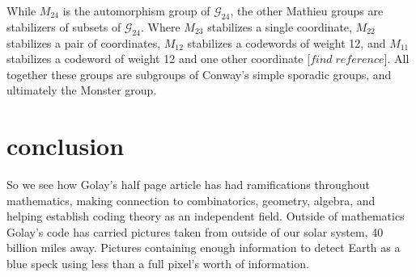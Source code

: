 \documentclass[paper=a4, fontsize=11pt]{scrartcl} %
\numberwithin{equation}{section} %
\numberwithin{figure}{section} %
\numberwithin{table}{section} %
\theoremstyle{break}
\begin{document}
While $M_{24}$ is the automorphism group of $\mathcal{G}_{24}$, the other Mathieu groups are stabilizers of subsets of $\mathcal{G}_{24}$. Where $M_{23}$ stabilizes a single coordinate, $M_{22}$ stabilizes a pair of coordinates, $M_{12}$ stabilizes a codewords of weight 12, and $M_{11}$ stabilizes a codeword of weight 12 and one other coordinate [$find \; reference$]. All together these groups are subgroups of Conway's simple sporadic groups, and ultimately the Monster group.

\section{conclusion}
So we see how Golay's half page article has had ramifications throughout mathematics, making connection to combinatorics, geometry, algebra, and helping establish coding theory as an independent field. Outside of mathematics Golay's code has carried pictures taken from outside of our solar system, 40 billion miles away. Pictures containing enough information to detect Earth as a blue speck using less than a full pixel's worth of information.
\clearpage
\printbibliography
\end{document}
